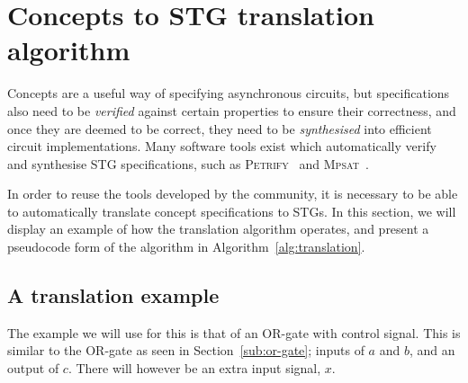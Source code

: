 \documentclass[british, journal]{IEEEtran}
\newcommand{\noun}[1]{\textsc{#1}}
\begin{document}
%

\vspace{-3mm}
\section{Concepts to STG translation algorithm\label{sec:algorithm}}

Concepts are a useful way of specifying asynchronous circuits, but
specifications also need to be \emph{verified} against certain properties to
ensure their correctness, and once they are deemed to be correct, they need to
be \emph{synthesised} into efficient circuit implementations. Many software
tools exist which automatically verify and synthesise STG specifications,
such as \noun{Petrify}~\cite{Cortadella} and
\noun{Mpsat}~\cite{khomenko2004detecting}.

In order to reuse the tools developed by the community, it is
necessary to be able to automatically translate concept specifications to STGs.
In this section, we will display an example of how the translation algorithm 
operates, and present a pseudocode form of the algorithm in Algorithm~\ref{alg:translation}. 

\vspace{-3mm}

\subsection{A translation example}

The example we will use for this is that of an OR-gate with control signal. 
This is similar to the OR-gate as seen in Section~\ref{sub:or-gate}; inputs
of $a$ and $b$, and an output of $c$. There will however be an extra 
input signal, $x$. 
\end{document}
